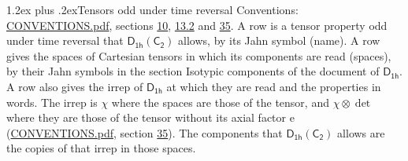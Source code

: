\documentclass[10pt,a4paper]{article}
\makeatletter
\renewcommand\section{\@startsection{section}{1}{\z@}{-3ex plus -1ex minus -.2ex}%
  {1.2ex plus .2ex}{\normalfont\large\sffamily\bfseries\color{parttitle}}}
\numberwithin{equation}{section}
\newcommand{\grp}[1]{\mathsf{#1}}
\newcommand{\irrprod}{\otimes}
\makeatother
\begin{document}
\section{Tensors odd under time reversal}\label{s:time_odd}
Conventions: \href{../../CONVENTIONS.pdf}{CONVENTIONS.pdf}, sections \href{../../../rotation/CONVENTIONS.pdf\#conv.10}{10}, \href{../../../rotation/CONVENTIONS.pdf\#conv.13.2}{13.2} and \href{../../CONVENTIONS.pdf\#conv.35}{35}.
\leavevmode\label{n:head.name.property}A row is a tensor property odd under time reversal that $\grp{D_{1h}}(\grp{C_{2}})$ allows, by its Jahn symbol (name). \label{n:head.spaces}A row gives the spaces of Cartesian tensors in which its components are read (spaces), by their Jahn symbols in the section Isotypic components of the document of \href{../../../rotation/data/pdf/D1h.pdf}{$\grp{D_{1h}}$}. \label{n:head.properties}A row also gives the irrep of $\grp{D_{1h}}$ at which they are read and the properties in words. The irrep is $\chi$ where the spaces are those of the tensor, and $\chi \irrprod \det$ where they are those of the tensor without its axial factor e (\href{../../CONVENTIONS.pdf}{CONVENTIONS.pdf}, section \href{../../CONVENTIONS.pdf\#conv.35}{35}). The components that $\grp{D_{1h}}(\grp{C_{2}})$ allows are the copies of that irrep in those spaces.
\end{document}
